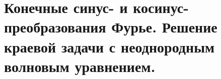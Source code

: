 \chapter{Конечные синус- и косинус-преобразования Фурье. Решение краевой задачи
с неоднородным волновым уравнением.}

\newpage
